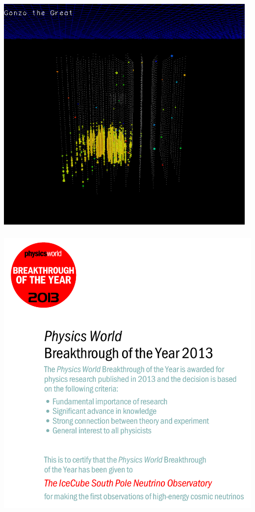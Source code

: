 \newpage

\begin{center}
\includegraphics[keepaspectratio,width=13cm]{gonzo-the-great}
\end{center}

\Tr
\onecolumn
\begin{center}
\includegraphics[keepaspectratio,height=15cm]{breakthrough}\\
\end{center}

